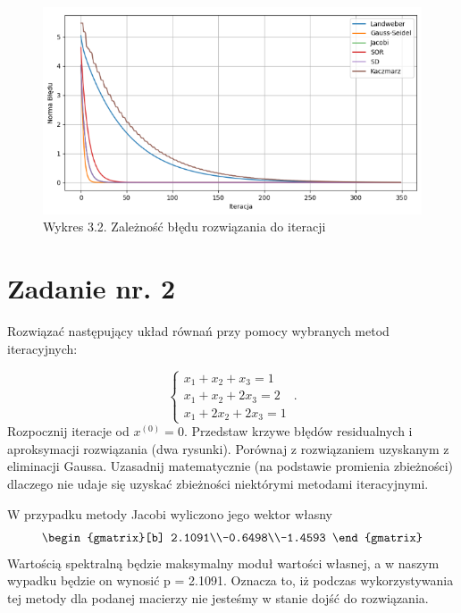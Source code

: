 \documentclass{article}
\begin{document}
\begin{figure}[H]
  \includegraphics[width=1.5\textwidth, center]{Zad1.2.png}
  \centering
  \captionsetup[Tabela]{name=New Table Name}
  \caption*{Wykres 3.2. Zależność błędu rozwiązania do iteracji}
\end{figure}
\section{Zadanie nr. 2}
Rozwiązać następujący układ równań przy pomocy wybranych metod iteracyjnych:

\begin{equation}
  \begin{cases}
    x_{1}+x_{2}+x_{3}=1 \\
   x_{1}+x_{2}+2x_{3}=2 \\
   x_{1} + 2x_{2} +2x_{3}= 1 
  \end{cases}\,.
\end{equation}
Rozpocznij iteracje od $x^{(0)}=0$. Przedstaw krzywe błędów residualnych i aproksymacji rozwiązania
(dwa rysunki). Porównaj z rozwiązaniem uzyskanym z eliminacji Gaussa. Uzasadnij matematycznie
(na podstawie promienia zbieżności) dlaczego nie udaje się uzyskać zbieżności
niektórymi metodami iteracyjnymi.\newline

W przypadku metody Jacobi wyliczono jego wektor własny
\begin{equation}
  \begin{gmatrix}[b]
    2.1091\\-0.6498\\-1.4593
  \end{gmatrix}
\end{equation}
Wartością spektralną będzie maksymalny moduł wartości własnej, a w naszym wypadku będzie on wynosić p = 2.1091. Oznacza to, iż podczas wykorzystywania tej metody dla podanej macierzy nie jesteśmy w stanie dojść do rozwiązania.\newline
\end{document}
